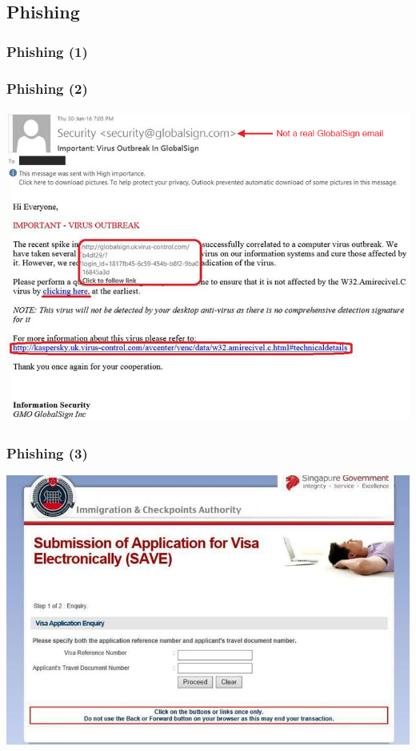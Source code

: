 \documentclass[aspectratio=169,dvipsnames]{beamer}
\begin{document}
\subsection{Phishing}

\begin{frame}
\frametitle{Phishing (1)}

\end{frame}

\begin{frame}
\frametitle{Phishing (2)}
\begin{center}
\includegraphics[scale=0.45]{images/phishing.png} 
\end{center}
\end{frame}

\begin{frame}
\frametitle{Phishing (3)}
\begin{center}
\includegraphics[scale=0.375]{images/phishing_gov} 
\end{center}
\end{frame}
\end{document}
